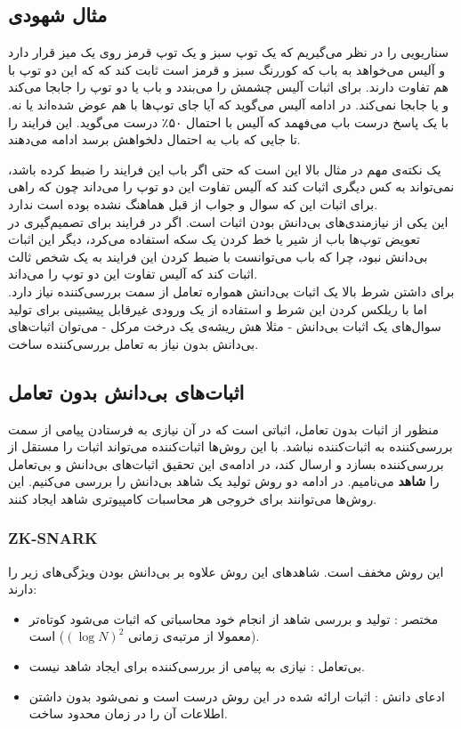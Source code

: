 \subsection{مثال شهودی}
سناریویی را در نظر می‌گیریم که یک توپ سبز و یک توپ قرمز روی یک میز قرار دارد و آلیس می‌خواهد به باب که کوررنگ سبز و قرمز است ثابت کند که که این دو توپ با هم تفاوت دارند. برای اثبات آلیس چشمش را می‌بندد و باب یا دو توپ را جابجا می‌کند و یا جابجا نمی‌کند. در ادامه آلیس می‌گوید که آیا جای توپ‌ها با هم عوض شده‌اند یا نه. با یک پاسخ درست باب می‌فهمد که آلیس با احتمال ۵۰٪ درست می‌گوید. این فرایند را تا جایی که باب به احتمال دلخواهش برسد ادامه می‌دهند.
\par
یک نکته‌ی مهم در مثال بالا این است که حتی اگر باب این فرایند را ضبط کرده باشد، نمی‌تواند به کس دیگری اثبات کند که آلیس تفاوت این دو توپ را می‌داند چون که راهی برای اثبات این که سوال و جواب از قبل هماهنگ نشده بوده است ندارد. 
\\
این یکی از نیازمندی‌های بی‌دانش بودن اثبات است. اگر در فرایند برای تصمیم‌گیری در تعویض توپ‌ها باب از شیر یا خط کردن یک سکه استفاده می‌کرد، دیگر این اثبات بی‌دانش نبود، چرا که باب می‌توانست با ضبط کردن این فرایند به یک شخص ثالث اثبات کند که آلیس تفاوت این دو توپ را می‌داند. 
\\
برای داشتن شرط بالا یک اثبات بی‌دانش همواره تعامل از سمت بررسی‌کننده نیاز دارد. اما با ریلکس کردن این شرط و استفاده از یک ورودی غیرقابل پیشبینی برای تولید سوال‌های یک اثبات بی‌دانش - مثلا هش ریشه‌ی یک درخت مرکل - می‌توان اثبات‌های بی‌دانش بدون نیاز به تعامل بررسی‌کننده ساخت. 


\subsection{اثبات‌های بی‌دانش بدون تعامل} 
منظور از اثبات بدون تعامل، اثباتی‌ است که در آن نیازی به فرستادن پیامی از سمت بررسی‌کننده به اثبات‌کننده نباشد. با این روش‌ها اثبات‌کننده می‌تواند اثبات را مستقل از بررسی‌کننده بسازد و ارسال کند، در ادامه‌ی این تحقیق اثبات‌های بی‌دانش و بی‌تعامل را 
\textbf{شاهد}
می‌نامیم. در ادامه دو روش تولید یک شاهد بی‌دانش را بررسی می‌کنیم. این روش‌ها می‌توانند برای خروجی هر محاسبات کامپیوتری شاهد ایجاد کنند. 

\subsubsection{ZK-SNARK}
این روش مخفف
است. شاهد‌های این روش علاوه بر بی‌دانش بودن ویژگی‌های زیر را دارند:
\begin{itemize}
	\item 
	مختصر
	: تولید و بررسی شاهد از انجام خود محاسباتی که اثبات می‌شود کوتاه‌تر (معمولا از مرتبه‌ی زمانی $ (\log N) ^ 2$) است. 
	\item
	بی‌تعامل
	: نیازی به پیامی از بررسی‌کننده برای ایجاد شاهد نیست. 
	\item
	ادعای دانش
	: اثبات ارائه شده در این روش درست 
	است و نمی‌شود بدون داشتن اطلاعات آن را در زمان محدود ساخت.
	
\end{itemize}
 
